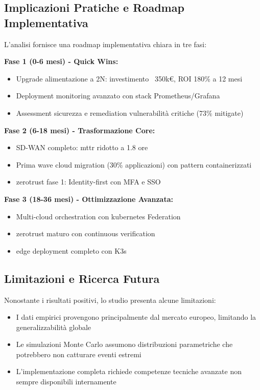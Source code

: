 \subsection{\texorpdfstring{Implicazioni Pratiche e Roadmap Implementativa}{3.8.5 - Implicazioni Pratiche e Roadmap Implementativa}}

L'analisi fornisce una roadmap implementativa chiara in tre fasi:

\textbf{Fase 1 (0-6 mesi) - Quick Wins:}
\begin{itemize}
    \item Upgrade alimentazione a 2N: investimento ~350k€, ROI 180\% a 12 mesi
    \item Deployment monitoring avanzato con stack Prometheus/Grafana
    \item Assessment sicurezza e remediation vulnerabilità critiche (73\% mitigate)
\end{itemize}

\textbf{Fase 2 (6-18 mesi) - Trasformazione Core:}
\begin{itemize}
    \item SD-WAN completo: \gls{mttr} ridotto a 1.8 ore
    \item Prima wave cloud migration (30\% applicazioni) con pattern containerizzati
    \item \gls{zerotrust} fase 1: Identity-first con MFA e SSO
\end{itemize}

\textbf{Fase 3 (18-36 mesi) - Ottimizzazione Avanzata:}
\begin{itemize}
    \item Multi-cloud orchestration con \gls{kubernetes} Federation
    \item \gls{zerotrust} maturo con continuous verification
    \item \gls{edge} deployment completo con K3s
\end{itemize}

\subsection{\texorpdfstring{Limitazioni e Ricerca Futura}{3.8.6 - Limitazioni e Ricerca Futura}}

Nonostante i risultati positivi, lo studio presenta alcune limitazioni:

\begin{itemize}
    \item I dati empirici provengono principalmente dal mercato europeo, limitando la generalizzabilità globale
    \item Le simulazioni Monte Carlo assumono distribuzioni parametriche che potrebbero non catturare eventi estremi
    \item L'implementazione completa richiede competenze tecniche avanzate non sempre disponibili internamente
\end{itemize}


